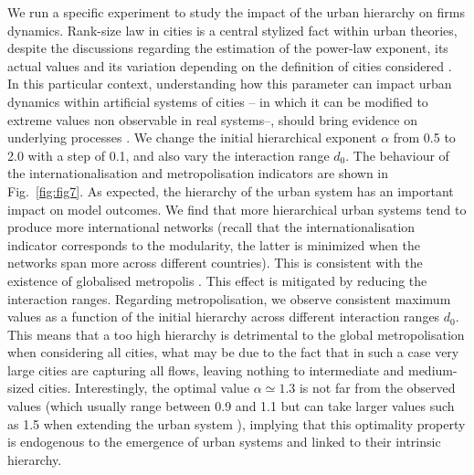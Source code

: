 \documentclass[10pt,letterpaper]{article}
\begin{document}
We run a specific experiment to study the impact of the urban hierarchy on firms dynamics. Rank-size law in cities is a central stylized fact within urban theories, despite the discussions regarding the estimation of the power-law exponent, its actual values and its variation depending on the definition of cities considered \cite{cottineau2017metazipf,corral2020truncated}. In this particular context, understanding how this parameter can impact urban dynamics within artificial systems of cities -- in which it can be modified to extreme values non observable in real systems--, should bring evidence on underlying processes \cite{raimbault2019space}. We change the initial hierarchical exponent $\alpha$ from 0.5 to 2.0 with a step of 0.1, and also vary the interaction range $d_0$. The behaviour of the internationalisation and metropolisation indicators are shown in Fig.~\ref{fig:fig7}. As expected, the hierarchy of the urban system has an important impact on model outcomes. We find that more hierarchical urban systems tend to produce more international networks (recall that the internationalisation indicator corresponds to the modularity, the latter is minimized when the networks span more across different countries). This is consistent with the existence of globalised metropolis \cite{sassen1991global}. This effect is mitigated by reducing the interaction ranges. Regarding metropolisation, we observe consistent maximum values as a function of the initial hierarchy across different interaction ranges $d_0$. This means that a too high hierarchy is detrimental to the global metropolisation when considering all cities, what may be due to the fact that in such a case very large cities are capturing all flows, leaving nothing to intermediate and medium-sized cities. Interestingly, the optimal value $\alpha \simeq 1.3$ is not far from the observed values (which usually range between 0.9 and 1.1 but can take larger values such as 1.5 when extending the urban system \cite{Raimbault_2020}), implying that this optimality property is endogenous to the emergence of urban systems and linked to their intrinsic hierarchy.
\end{document}

